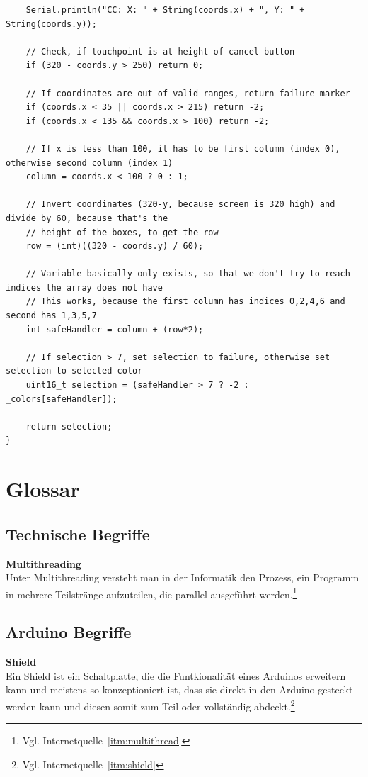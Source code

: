 \documentclass[a4paper, 11pt]{scrartcl}
\begin{document}
\begin{small}
\begin{lstlisting}
    Serial.println("CC: X: " + String(coords.x) + ", Y: " + String(coords.y));

    // Check, if touchpoint is at height of cancel button
    if (320 - coords.y > 250) return 0;

    // If coordinates are out of valid ranges, return failure marker
    if (coords.x < 35 || coords.x > 215) return -2;
    if (coords.x < 135 && coords.x > 100) return -2;

    // If x is less than 100, it has to be first column (index 0), otherwise second column (index 1)
    column = coords.x < 100 ? 0 : 1;

    // Invert coordinates (320-y, because screen is 320 high) and divide by 60, because that's the 
    // height of the boxes, to get the row
    row = (int)((320 - coords.y) / 60);

    // Variable basically only exists, so that we don't try to reach indices the array does not have
    // This works, because the first column has indices 0,2,4,6 and second has 1,3,5,7
    int safeHandler = column + (row*2);

    // If selection > 7, set selection to failure, otherwise set selection to selected color
    uint16_t selection = (safeHandler > 7 ? -2 : _colors[safeHandler]);

    return selection;
}
\end{lstlisting}











\end{small}
\newpage
\section{Glossar}
\subsection{Technische Begriffe}
\textbf{Multithreading\label{def:multithreading}}
\\
Unter Multithreading versteht man in der Informatik den Prozess, ein Programm in mehrere Teilstränge aufzuteilen, die parallel 
ausgeführt werden.\footnote{Vgl. Internetquelle~\ref{itm:multithread}}
\subsection{Arduino Begriffe}
\textbf{Shield\label{def:shield}}
\\
Ein Shield ist ein Schaltplatte, die die Funtkionalität eines Arduinos erweitern kann und meistens so konzeptioniert ist, dass sie direkt in den Arduino gesteckt werden kann und diesen somit
zum Teil oder vollständig abdeckt.\footnote{Vgl. Internetquelle~\ref{itm:shield}}
\newpage
\end{document}
